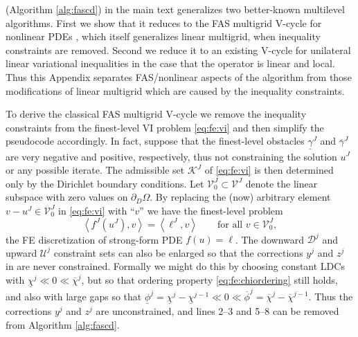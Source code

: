 \documentclass[letterpaper,final,12pt,reqno]{amsart}
\theoremstyle{cstyle}
\theoremstyle{cstyle*}
\theoremstyle{dstyle}
\numberwithin{equation}{section}
\numberwithin{figure}{section}
\numberwithin{table}{section}
\numberwithin{theorem}{section}
\newcommand{\ip}[2]{\left<#1,#2\right>}
\begin{document}
 (Algorithm \ref{alg:fascd}) in the main text generalizes two better-known multilevel algorithms.  First we show that it reduces to the FAS multigrid V-cycle for nonlinear PDEs \cite{Trottenbergetal2001}, which itself generalizes linear multigrid, when inequality constraints are removed.  Second we reduce it to an existing V-cycle for unilateral linear variational inequalities \cite{GraeserKornhuber2009} in the case that the operator is linear and local.  Thus this Appendix separates FAS/nonlinear aspects of the algorithm from those modifications of linear multigrid which are caused by the inequality constraints.

To derive the classical FAS multigrid V-cycle we remove the inequality constraints from the finest-level VI problem \eqref{eq:fe:vi} and then simplify the  pseudocode accordingly.  In fact, suppose that the finest-level obstacles $\underline{\gamma}^J$ and $\overline{\gamma}^J$ are very negative and positive, respectively, thus not constraining the solution $u^J$ or any possible iterate.  The admissible set $\mathcal{K}^J$ of \eqref{eq:fe:vi} is then determined only by the Dirichlet boundary conditions.  Let $\mathcal{V}_0^J \subset \mathcal{V}^J$ denote the linear subspace with zero values on $\partial_D\Omega$.  By replacing the (now) arbitrary element $v-u^J\in\mathcal{V}_0^J$ in \eqref{eq:fe:vi} with ``$v$'' we have the finest-level problem
\begin{equation}
\ip{f^J(u^J)}{v} = \ip{\ell^J}{v} \qquad \text{for all } v\in \mathcal{V}_0^J, \label{eq:app:fas:pde}
\end{equation}
the FE discretization of strong-form PDE $f(u)=\ell$.  The downward $\mathcal{D}^j$ and upward $\mathcal{U}^j$ constraint sets can also be enlarged so that the corrections $y^j$ and $z^j$ in  are never constrained.  Formally we might do this by choosing constant LDCs with $\underline{\chi}^j \ll 0 \ll \overline{\chi}^j$, but so that ordering property \eqref{eq:fe:chiordering} still holds, and also with large gaps so that $\underline{\phi}^j = \underline{\chi}^j - \underline{\chi}^{j-1} \ll 0 \ll \overline{\phi}^j = \overline{\chi}^j - \overline{\chi}^{j-1}$.  Thus the corrections $y^j$ and $z^j$ are unconstrained, and lines 2--3 and 5--8 can be removed from Algorithm \ref{alg:fascd}.
\end{document}
